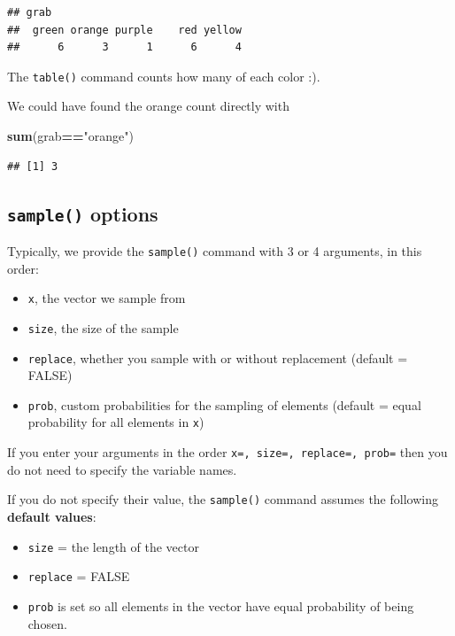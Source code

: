 \documentclass[
]{book}
\newenvironment{Shaded}{\begin{snugshade}}{\end{snugshade}}
\newcommand{\FunctionTok}[1]{\textcolor[rgb]{0.13,0.29,0.53}{\textbf{#1}}}
\newcommand{\NormalTok}[1]{#1}
\newcommand{\SpecialCharTok}[1]{\textcolor[rgb]{0.81,0.36,0.00}{\textbf{#1}}}
\newcommand{\StringTok}[1]{\textcolor[rgb]{0.31,0.60,0.02}{#1}}
\providecommand{\tightlist}{%
  \setlength{\itemsep}{0pt}\setlength{\parskip}{0pt}}
\theoremstyle{definition}
\theoremstyle{definition}
\theoremstyle{definition}
\theoremstyle{definition}
\theoremstyle{remark}
\begin{document}
\begin{verbatim}
## grab
##  green orange purple    red yellow 
##      6      3      1      6      4
\end{verbatim}

The \texttt{table()} command counts how many of each color :).

We could have found the orange count directly with

\begin{Shaded}
\begin{Highlighting}[]
\FunctionTok{sum}\NormalTok{(grab}\SpecialCharTok{==}\StringTok{"orange"}\NormalTok{)}
\end{Highlighting}
\end{Shaded}

\begin{verbatim}
## [1] 3
\end{verbatim}

\subsection*{\texorpdfstring{\texttt{sample()} options}{sample() options}}\label{sample-options}

Typically, we provide the \texttt{sample()} command with 3 or 4 arguments, in this order:

\begin{itemize}
\tightlist
\item
  \texttt{x}, the vector we sample from
\item
  \texttt{size}, the size of the sample
\item
  \texttt{replace}, whether you sample with or without replacement (default = FALSE)
\item
  \texttt{prob}, custom probabilities for the sampling of elements (default = equal probability for all elements in \texttt{x})
\end{itemize}

If you enter your arguments in the order \texttt{x=,\ size=,\ replace=,\ prob=} then you do not need to specify the variable names.

If you do not specify their value, the \texttt{sample()} command assumes the following \textbf{default values}:

\begin{itemize}
\tightlist
\item
  \texttt{size} = the length of the vector
\item
  \texttt{replace} = FALSE
\item
  \texttt{prob} is set so all elements in the vector have equal probability of being chosen.
\end{itemize}
\end{document}
